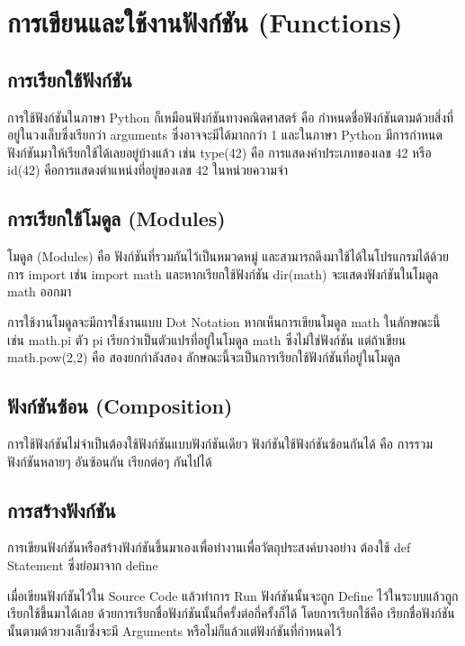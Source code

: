 \chapter{การเขียนและใช้งานฟังก์ชัน (Functions)}
\section{การเรียกใช้ฟังก์ชัน}

การใช้ฟังก์ชันในภาษา Python ก็เหมือนฟังก์ชันทางคณิตศาสตร์ คือ กำหนดชื่อฟังก์ชันตามด้วยสิ่งที่อยู่ในวงเล็บซึ่งเรียกว่า arguments ซึ่งอาจจะมีได้มากกว่า 1 และในภาษา Python มีการกำหนดฟังก์ชันมาให้เรียกใช้ได้เลยอยู่บ้างแล้ว เช่น type(42) คือ การแสดงค่าประเภทของเลข 42 หรือ id(42) คือการแสดงตำแหน่งที่อยู่ของเลข 42 ในหน่วยความจำ

\section{การเรียกใช้โมดูล (Modules)}

โมดูล (Modules) คือ ฟังก์ชันที่รวมกันไว้เป็นหมวดหมู่ และสามารถดึงมาใช้ได้ในโปรแกรมได้ด้วยการ import เช่น import math และหากเรียกใช้ฟังก์ชัน dir(math) จะแสดงฟังก์ชันในโมดูล math ออกมา 

การใช้งานโมดูลจะมีการใช้งานแบบ Dot Notation หากเห็นการเขียนโมดูล math ในลักษณะนี้ เช่น math.pi ตัว pi เรียกว่าเป็นตัวแปรที่อยู่ในโมดูล math ซึ่งไม่ใช่ฟังก์ชัน แต่ถ้าเขียน math.pow(2,2) คือ สองยกกำลังสอง ลักษณะนี้จะเป็นการเรียกใช้ฟังก์ชันที่อยู่ในโมดูล

\section{ฟังก์ชันซ้อน (Composition)}

การใช้ฟังก์ชันไม่จำเป็นต้องใช้ฟังก์ชันแบบฟังก์ชันเดียว ฟังก์ชันใช้ฟังก์ชันซ้อนกันได้ คือ การรวมฟังก์ชันหลายๆ อันซ้อนกัน เรียกต่อๆ กันไปได้

\section{การสร้างฟังก์ชัน}

การเขียนฟังก์ชันหรือสร้างฟังก์ชันขึ้นมาเองเพื่อทำงานเพื่อวัตถุประสงค์บางอย่าง ต้องใช้ def Statement ซึ่งย่อมาจาก define 

เมื่อเขียนฟังก์ชันไว้ใน Source Code แล้วทำการ Run ฟังก์ชันนั้นจะถูก Define ไว้ในระบบแล้วถูกเรียกใช้ขึ้นมาได้เลย ด้วยการเรียกชื่อฟังก์ชันนั้นกี่ครั้งต่อกี่ครั้งก็ได้ โดยการเรียกใช้คือ เรียกชื่อฟังก์ชันนั้นตามด้วยวงเล็บซึ่งจะมี Arguments หรือไม่ก็แล้วแต่ฟังก์ชันที่กำหนดไว้

